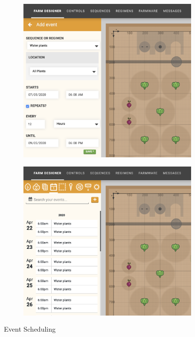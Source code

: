 \begin{itemize}
    \begin{figure}[H]
        \centering
        \begin{subfigure}{0.49\linewidth}
            \centering
            \includegraphics[width=\linewidth]{Figures/ui_schedule.png}
            \label{fig:ui_schedule}
        \end{subfigure}
    \hfill
        \begin{subfigure}{0.49\linewidth}
            \centering
            \includegraphics[width=\linewidth]{Figures/ui_sch2.png}
            \label{fig:ui_schedule2}
        \end{subfigure}
    \caption{Event Scheduling}
    \label{fig:event_scheduling}
    \end{figure}


\end{itemize}
